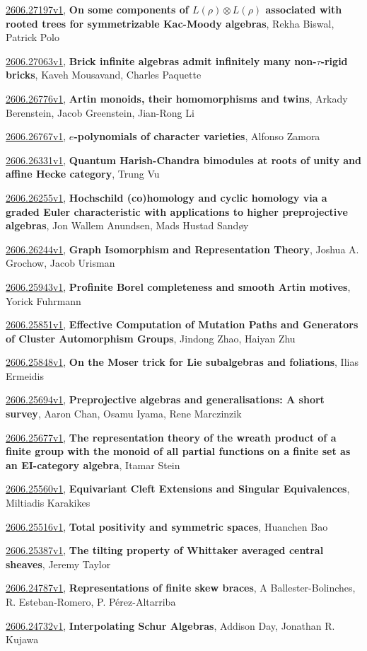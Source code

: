 \documentclass[9pt, a4paper]{article}
\theoremstyle{plain}
\theoremstyle{definition}
\theoremstyle{remark}
\newcommand{\arxiv}[3]{\href{https://arxiv.org/abs/#1}{#1}, \textbf{\textcolor{arxivblue}{#2}}, #3}
\begin{document}
\arxiv{2606.27197v1}{On some components of $L(ρ)\otimes L(ρ)$ associated with rooted trees for symmetrizable Kac-Moody algebras}{Rekha Biswal, Patrick Polo}

\arxiv{2606.27063v1}{Brick infinite algebras admit infinitely many non-$τ$-rigid bricks}{Kaveh Mousavand, Charles Paquette}

\arxiv{2606.26776v1}{Artin monoids, their homomorphisms and twins}{Arkady Berenstein, Jacob Greenstein, Jian-Rong Li}

\arxiv{2606.26767v1}{$e$-polynomials of character varieties}{Alfonso Zamora}

\arxiv{2606.26331v1}{Quantum Harish-Chandra bimodules at roots of unity and affine Hecke category}{Trung Vu}

\arxiv{2606.26255v1}{Hochschild (co)homology and cyclic homology via a graded Euler characteristic with applications to higher preprojective algebras}{Jon Wallem Anundsen, Mads Hustad Sandøy}

\arxiv{2606.26244v1}{Graph Isomorphism and Representation Theory}{Joshua A. Grochow, Jacob Urisman}

\arxiv{2606.25943v1}{Profinite Borel completeness and smooth Artin motives}{Yorick Fuhrmann}

\arxiv{2606.25851v1}{Effective Computation of Mutation Paths and Generators of Cluster Automorphism Groups}{Jindong Zhao, Haiyan Zhu}

\arxiv{2606.25848v1}{On the Moser trick for Lie subalgebras and foliations}{Ilias Ermeidis}

\arxiv{2606.25694v1}{Preprojective algebras and generalisations: A short survey}{Aaron Chan, Osamu Iyama, Rene Marczinzik}

\arxiv{2606.25677v1}{The representation theory of the wreath product of a finite group with the monoid of all partial functions on a finite set as an EI-category algebra}{Itamar Stein}

\arxiv{2606.25560v1}{Equivariant Cleft Extensions and Singular Equivalences}{Miltiadis Karakikes}

\arxiv{2606.25516v1}{Total positivity and symmetric spaces}{Huanchen Bao}

\arxiv{2606.25387v1}{The tilting property of Whittaker averaged central sheaves}{Jeremy Taylor}

\arxiv{2606.24787v1}{Representations of finite skew braces}{A Ballester-Bolinches, R. Esteban-Romero, P. Pérez-Altarriba}

\arxiv{2606.24732v1}{Interpolating Schur Algebras}{Addison Day, Jonathan R. Kujawa}
\end{document}
